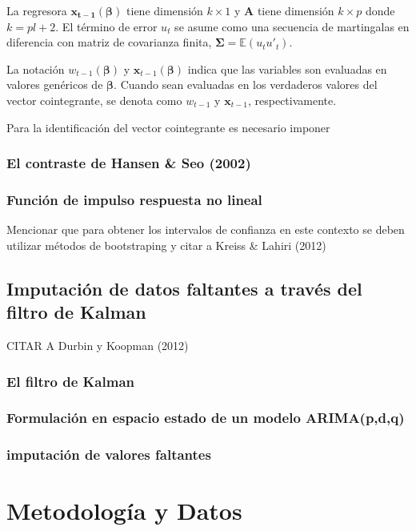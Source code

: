 \documentclass[12pt, twoside]{book}\usepackage[]{graphicx}\usepackage[]{color}
\numberwithin{equation}{section}
\numberwithin{theorem}{section}
\numberwithin{teorema}{section}
\numberwithin{defi}{section}
\numberwithin{prop}{section}
\numberwithin{defi}{section}
\theoremstyle{plain}
\begin{document}
La regresora $\mathbf{x_{t-1}}(\boldsymbol{\beta})$ tiene dimensión $k\times 1$ y $\mathbf{A}$ tiene dimensión $k\times p$ donde $k=pl+2$. El término de error $u_{t}$ se asume como una secuencia de martingalas en diferencia con matriz de covarianza finita, $\boldsymbol{\Sigma} = \mathbb{E}(u_{t}u'_{t})$. 

La notación $w_{t-1}(\boldsymbol{\beta})$ y $\mathbf{x}_{t-1}(\boldsymbol{\beta})$ indica que las variables son evaluadas en valores genéricos de $\boldsymbol{\beta}$. Cuando sean evaluadas en los verdaderos valores del vector cointegrante, se denota como $w_{t-1}$ y $\mathbf{x}_{t-1}$, respectivamente. 

Para la identificación del vector cointegrante es necesario imponer 

\subsection{El contraste de Hansen \& Seo (2002)}

\subsection{Función de impulso respuesta no lineal}

Mencionar que para obtener los intervalos de confianza en este contexto se deben utilizar métodos de bootstraping y citar a Kreiss \& Lahiri (2012)

\section{Imputación de datos faltantes a través del filtro de Kalman}
CITAR A Durbin y Koopman (2012)
\subsection{El filtro de Kalman}
\subsection{Formulación en espacio estado de un modelo ARIMA(p,d,q)}
\subsection{imputación de valores faltantes}



\chapter{Metodología y Datos}
\end{document}
